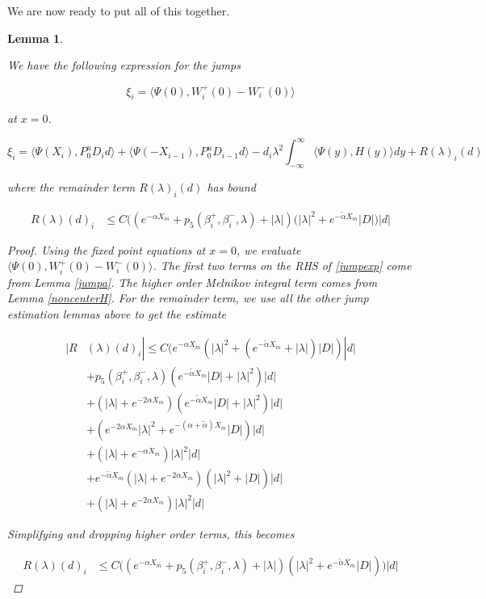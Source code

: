 \documentclass[12pt]{article}
\newtheorem{lemma}{Lemma}
\begin{document}
We are now ready to put all of this together.


\begin{lemma}\label{jump}

We have the following expression for the jumps 

\[
\xi_i = \langle \Psi(0), W_i^+(0) - W_i^-(0) \rangle
\]

at $x = 0$.

\begin{equation}\label{jumpexp}
\xi_i = \langle \Psi(X_i), P^u_0 D_i d \rangle + \langle \Psi(-X_{i-1}), P^u_0 D_{i-1} d \rangle - d_i \lambda^2 \int_{-\infty}^\infty \langle \Psi(y), H(y) \rangle dy + R(\lambda)_i(d)
\end{equation}

where the remainder term $R(\lambda)_i(d)$ has bound

\begin{align}\label{remainder1}
R(\lambda)(d)_i &\leq C \Big( ( e^{-\alpha X_m} + p_5(\beta_i^+, \beta_i^-, \lambda) + |\lambda|  )(|\lambda|^2 + e^{-\tilde{\alpha}X_m} |D|\Big) |d|
\end{align}

\begin{proof}
Using the fixed point equations at $x = 0$, we evaluate $\langle \Psi(0), W_i^+(0) - W_i^-(0) \rangle$. The first two terms on the RHS of \eqref{jumpexp} come from Lemma \ref{jumpa}. The higher order Melnikov integral term comes from Lemma \ref{noncenterH}. For the remainder term, we use all the other jump estimation lemmas above to get the estimate

\begin{align*}
|R&(\lambda)(d)_i| \leq C \Big( 
e^{-\alpha X_m} (|\lambda|^2  + (e^{-\tilde{\alpha} X_m} + |\lambda|)|D|)|d|  \\
&+ p_5(\beta_i^+, \beta_i^-, \lambda) (e^{-\tilde{\alpha} X_m} |D| + |\lambda|^2 )|d| \\
&+ (|\lambda| + e^{-2 \alpha X_m} )( e^{-\tilde{\alpha} X_m} |D| + |\lambda|^2 )|d| \\
&+ (e^{-2 \alpha X_m} |\lambda|^2 + e^{-(\alpha + \tilde{\alpha}) X_m} |D|) |d| \\
&+ ( |\lambda| + e^{-\alpha X_m} ) |\lambda|^2 |d| \\
&+ e^{-\tilde{\alpha} X_m} (|\lambda| + e^{-2 \alpha X_m})(|\lambda|^2 + |D|) |d| \\
&+ (|\lambda| + e^{-2 \alpha X_m} ) |\lambda|^2  |d|
\end{align*}

Simplifying and dropping higher order terms, this becomes

\begin{align*}
R(\lambda)(d)_i &\leq C \Big( ( e^{-\alpha X_m} + p_5(\beta_i^+, \beta_i^-, \lambda) + |\lambda|  )(|\lambda|^2 + e^{-\tilde{\alpha}X_m} |D|) \Big) |d|
\end{align*}

\end{proof}
\end{lemma}
\end{document}
